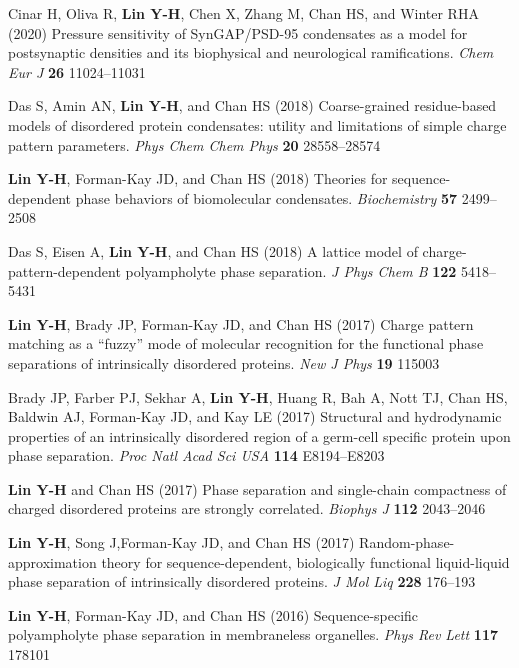 \documentclass[11pt]{../yhlcv}
\def\tname#1{{\bf #1}}
\begin{document}
\begin{etaremune}[leftmargin=0.26in]
\item
Cinar H, Oliva R, \tname{Lin Y-H}, Chen X, Zhang M, Chan HS, and Winter RHA (2020)
Pressure sensitivity of SynGAP/PSD-95 condensates as a model for postsynaptic densities and its biophysical and neurological ramifications. 
{\it Chem Eur J} {\bf 26} 11024--11031 %

\item 
Das S, Amin AN, \tname{Lin Y-H}, and Chan HS (2018)
Coarse-grained residue-based models of disordered protein condensates: 
utility and limitations of simple charge pattern parameters.
{\it Phys Chem Chem Phys} {\bf 20} 28558--28574 

\item
\tname{Lin Y-H}, Forman-Kay JD, and Chan HS (2018)
Theories for sequence-dependent phase behaviors of biomolecular condensates.
{\it Biochemistry} {\bf 57} 2499--2508

\item 
Das S, Eisen A, \tname{Lin Y-H}, and Chan HS (2018)
A lattice model of charge-pattern-dependent polyampholyte phase separation.
{\it J Phys Chem B} {\bf 122} 5418--5431

\item
\tname{Lin Y-H}, Brady JP, Forman-Kay JD, and Chan HS (2017) 
Charge pattern matching as a ``fuzzy'' mode of molecular recognition for the functional phase separations of intrinsically disordered proteins.
{\it New J Phys} {\bf 19} 115003

\item 
Brady JP, Farber PJ, Sekhar A, \tname{Lin Y-H}, Huang R, Bah A, Nott TJ, Chan HS, Baldwin AJ, Forman-Kay JD, and Kay LE (2017) 
Structural and hydrodynamic properties of an intrinsically disordered region of a germ-cell specific protein upon phase separation. 
{\it Proc Natl Acad Sci USA} {\bf 114} E8194--E8203

\item
\tname{Lin Y-H} and Chan HS (2017) 
Phase separation and single-chain compactness of charged disordered proteins are strongly correlated. 
{\it Biophys J} {\bf 112} 2043--2046

\item 
\tname{Lin Y-H}, Song J,Forman-Kay JD, and Chan HS  (2017) 
Random-phase-approximation theory for sequence-dependent, biologically functional liquid-liquid phase separation of intrinsically disordered proteins. 
{\it J Mol Liq} {\bf 228} 176--193

\item
\tname{Lin Y-H}, Forman-Kay JD, and Chan HS (2016) 
Sequence-specific polyampholyte phase separation in membraneless organelles. 
{\it Phys Rev Lett} {\bf 117} 178101


\end{etaremune}
\end{document}
